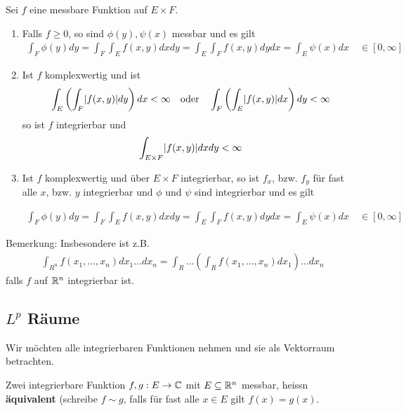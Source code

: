 \begin{satz}[Fubini]
Sei $f$ eine messbare Funktion auf $E \times F$.
\begin{enumerate}
				\item Falls $f \geq 0$, so sind $\phi(y),\psi(x)$ messbar und es gilt
\begin{align*}
				\int_F\phi(y)dy = \int_F\int_Ef(x,y)dx dy = \int_E\int_F f(x,y) dy dx = \int_E\psi(x)dx \quad \in [0,\infty]
\end{align*}
	\item Ist $f$ komplexwertig und ist 
\begin{align*}
				\int_E \left(\int_F \abs{f(x,y)} dy\right) dx < \infty \quad \text{oder} \quad \int_F \left(\int_E \abs{f(x,y)} dx\right)dy < \infty
\end{align*}
so ist $f$ integrierbar und
\begin{align*}
	\int_{E \times F} \abs{f(x,y)}dx dy < \infty
\end{align*}

	\item Ist $f$ komplexwertig und über $E \times F$ integrierbar, so ist $f_x$, bzw. $f_y$ für fast alle $x$, bzw. $y$ integrierbar und $\phi$ und $\psi$ sind integrierbar und es gilt

\begin{align*}
	\int_F\phi(y)dy = \int_F\int_Ef(x,y)dx dy = \int_E\int_F f(x,y) dy dx = \int_E\psi(x)dx \quad \in [0,\infty]
\end{align*}
\end{enumerate}
\end{satz}

Bemerkung: Insbesondere ist z.B.
\begin{align*}
				\int_{R^n}f(x_1, \ldots, x_n) dx_1 \dots dx_n = \int_R \dots \left(\int_R f(x_1, \ldots, x_n) dx_1\right)\dots dx_n
\end{align*}
falls $f$ auf $\mathbb{R}^n$ integrierbar ist.


\subsection{$L^p$ Räume}

Wir möchten alle integrierbaren Funktionen nehmen und sie als Vektorraum betrachten.
\begin{definition}[]
	Zwei integrierbare Funktion $f,g: E \to \mathbb{C}$ mit $E \subseteq \mathbb{R}^n$ messbar, heissn \textbf{äquivalent} (schreibe $f \sim g$, falls für fast alle $x \in E$ gilt $f(x) = g(x)$.
\end{definition}

